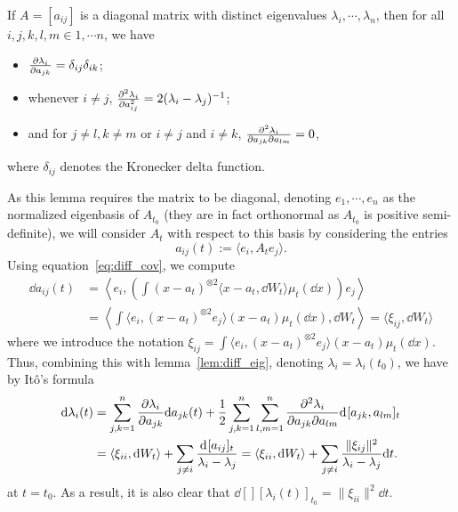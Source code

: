 \begin{lemma}\label{lem:diff_eig}
  If \(A = [a_{ij}]\) is a diagonal matrix with distinct eigenvalues \(\lambda_i, \cdots, \lambda_n\), then 
  for all \(i, j, k, l, m \in {1, \cdots n}\), we have
  \begin{itemize}
    \item \(\pdv{\lambda_i}{a_{jk}} = \delta_{ij} \delta_{ik}\);
    \item whenever \(i \neq j\), \(\pdv[2]{\lambda_i}{a_{ij}} = 2(\lambda_i - \lambda_j)^{-1}\);
    \item and for \(j \neq l, k \neq m\) or \(i \neq j\) and \(i \neq k\),
      \(\pdv[2]{\lambda_i}{a_{jk}}{a_{lm}} = 0\),
  \end{itemize}
  where \(\delta_{ij}\) denotes the Kronecker delta function.
\end{lemma}

As this lemma requires the matrix to be diagonal, denoting \(e_1, \cdots, e_n\) as the normalized 
eigenbasis of \(A_{t_0}\) (they are in fact orthonormal as \(A_{t_0}\) is positive semi-definite), 
we will consider \(A_t\) with respect to this basis by considering the entries 
\[a_{ij}(t) := \langle e_i, A_t e_j\rangle.\]
Using equation~\ref{eq:diff_cov}, we compute 
\begin{align*}
  \dd a_{ij}(t) & = \left\langle e_i, \left(\int (x - a_t)^{\otimes 2} 
    \langle x - a_t, \dd W_t \rangle \mu_t(\dd x)\right) e_j \right\rangle\\
    & = \left\langle\int \langle e_i, (x - a_t)^{\otimes 2} e_j\rangle
      (x - a_t) \mu_t(\dd x), \dd W_t\right\rangle
      = \langle \xi_{ij}, \dd W_t\rangle
\end{align*}
where we introduce the notation \(\xi_{ij} = \int \langle e_i, (x - a_t)^{\otimes 2} e_j\rangle (x - a_t) \mu_t(\dd x).\)
Thus, combining this with lemma~\ref{lem:diff_eig}, 
denoting \(\lambda_i = \lambda_i(t_0)\), we have by Itô's formula
\begin{equation}
  \begin{split}
    \dd \lambda_i(t) 
    & = \sum_{j, k = 1}^n \pdv{\lambda_i}{a_{jk}} \dd a_{jk}(t) 
      + \frac{1}{2}\sum_{j, k = 1}^n \sum_{l, m = 1}^n \pdv[2]{\lambda_i}{a_{jk}}{a_{lm}} \dd[] [a_{jk}, a_{lm}]_t\\
    & = \langle \xi_{ii}, \dd W_t\rangle + \sum_{j \neq i} \frac{\dd[][a_{ij}]_t}{\lambda_i - \lambda_j}
      = \langle \xi_{ii}, \dd W_t\rangle + \sum_{j \neq i} \frac{\|\xi_{ij}\|^2}{\lambda_i - \lambda_{j}} \dd t.
  \end{split}
\end{equation}
at \(t = t_0\). As a result, it is also clear that \(\dd[][\lambda_i(t)]_{t_0} = \|\xi_{ii}\|^2 \dd t\). 

